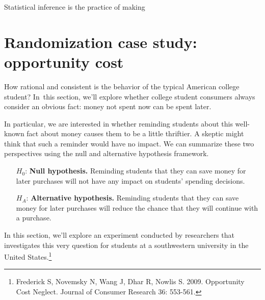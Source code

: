 
Statistical inference is the practice of making 



\section{Randomization case study: opportunity cost}
\label{caseStudyOpportunityCost}

How rational and consistent is the behavior of the typical American college student? In~this section, we'll explore whether college student consumers always consider an obvious fact: money not spent now can be spent later.

In particular, we are interested in whether reminding students about this well-known fact about money causes them to be a little thriftier. A skeptic might think that such a reminder would have no impact. We can summarize these two perspectives using the null and alternative hypothesis framework.
\begin{itemize}
\setlength{\itemsep}{0mm}
\item[$H_0$:] \textbf{Null hypothesis.} Reminding students that they can save money for later purchases will not have any impact on students' spending decisions.
\item[$H_A$:] \textbf{Alternative hypothesis.} Reminding students that they can save money for later purchases will reduce the chance that they will continue with a purchase.
\end{itemize}
In this section, we'll explore an experiment conducted by researchers that investigates this very question for students at a southwestern university in the United States.\footnote{Frederick S, Novemsky N, Wang J, Dhar R, Nowlis S. 2009. Opportunity Cost Neglect. Journal of Consumer Research 36: 553-561.}

